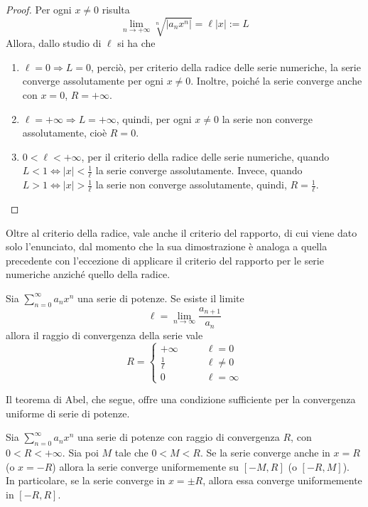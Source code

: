 \begin{proof}
    Per ogni $x \neq 0$ risulta
    \begin{equation*}
        \lim_{n \to +\infty}{\sqrt[n]{|a_n x^n|}} = \ell|x| := L
    \end{equation*}
    Allora, dallo studio di $\ell$ si ha che
    \begin{enumerate}
        \item $\ell=0 \Rightarrow L=0$, perciò, per criterio della radice delle serie numeriche, la serie converge assolutamente per ogni $x \neq 0$. Inoltre, poiché la serie converge anche con $x=0$, $R=+\infty$.
        \item $\ell= +\infty \Rightarrow L =+ \infty$, quindi, per ogni $x \neq 0$ la serie non converge assolutamente, cioè $R=0$.
        \item $0< \ell<+\infty$, per il criterio della radice delle serie numeriche, quando $L<1 \iff |x|< \tfrac{1}{\ell}$ la serie converge assolutamente. Invece, quando $L>1 \iff |x|>\tfrac{1}{\ell}$ la serie non converge assolutamente, quindi, $R= \tfrac{1}{\ell}$.
    \end{enumerate}
\end{proof}
Oltre al criterio della radice, vale anche il criterio del rapporto, di cui viene dato solo l'enunciato, dal momento che la sua dimostrazione è analoga a quella precedente con l'eccezione di applicare il criterio del rapporto per le serie numeriche anziché quello della radice.
\begin{theorem}
    Sia $\sum\limits_{n=0}^{\infty}{a_n x^n}$ una serie di potenze. Se esiste il limite
    \begin{equation*}
        \ell= \lim_{n \to \infty}{\frac{a_{n+1}}{a_n}}
    \end{equation*}
    allora il raggio di convergenza della serie vale
    \begin{equation*}
        R= \begin{cases}
        +\infty &\qquad \ell=0\\
        \frac{1}{\ell} &\qquad \ell \neq 0\\
        0 &\qquad \ell = \infty
        \end{cases}
    \end{equation*}
\end{theorem}
Il teorema di Abel, che segue, offre una condizione sufficiente per la convergenza uniforme di serie di potenze.
\begin{theorem} \label{Teo: Teorema di Abel}
    Sia $\sum\limits_{n=0}^{\infty}{a_n x^n}$ una serie di potenze con raggio di convergenza $R$, con $0<R<+\infty$. Sia poi $M$ tale che $0<M<R$. Se la serie converge anche in $x=R$ (o $x=-R$) allora la serie converge uniformemente su $[-M, R]$ (o $[-R, M]$). \\
    In particolare, se la serie converge in $x= \pm R$, allora essa converge uniformemente in $[-R, R]$.
\end{theorem}
